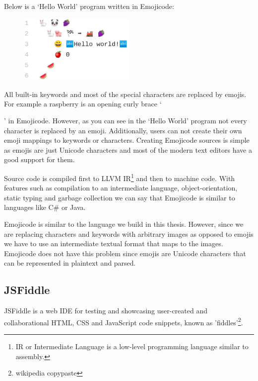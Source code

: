 Below is a `Hello World' program written in Emojicode:
\begin{figure}[!hbt]
	\includegraphics[width=0.5\textwidth]{../img/emojicode_helloworld}
	\label{fig:chap1:emojicode_helloworld}
\end{figure}

All built-in keywords and most of the special characters are replaced by emojis. For example a raspberry is an opening curly brace `{' in Emojicode.
However, as you can see in the `Hello World' program not every character is replaced by an emoji. Additionally, users can not create their own emoji
mappings to keywords or characters. Creating Emojicode sources is simple as emojis are just Unicode characters and most of the modern text editors
have a good support for them.

Source code is compiled first to LLVM IR\footnote{IR or Intermediate Language is a low-level programming language similar to assembly.} and then to
machine code. With features such as compilation to an intermediate language, object-orientation, static typing and garbage collection we can
say that Emojicode is similar to languages like C\# or Java.

Emojicode is similar to the language we build in this thesis. However, since we are replacing characters and keywords with arbitrary images as
opposed to emojis we have to use an intermediate textual format that maps to the images. Emojicode does not have this problem since emojis are
Unicode characters that can be represented in plaintext and parsed.

\subsection{JSFiddle}
JSFiddle \cite{JSFiddle} is a web IDE for testing and showcasing user-created and collaborational HTML, CSS and JavaScript code snippets, known as
'fiddles'\footnote{wikipedia copypaste}.

}
